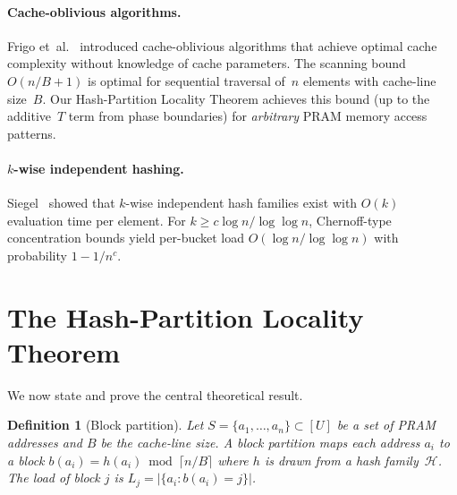 \documentclass[11pt]{article}
\newtheorem{definition}[theorem]{Definition}
\begin{document}
\paragraph{Cache-oblivious algorithms.}
Frigo et~al.~\cite{frigo1999cache} introduced cache-oblivious algorithms
that achieve optimal cache complexity without knowledge of cache parameters.
The scanning bound~$O(n/B + 1)$ is optimal for sequential traversal of~$n$
elements with cache-line size~$B$.  Our Hash-Partition Locality Theorem
achieves this bound (up to the additive~$T$ term from phase boundaries) for
\emph{arbitrary} PRAM memory access patterns.

\paragraph{$k$-wise independent hashing.}
Siegel~\cite{siegel2004hash} showed that $k$-wise independent hash families
exist with $O(k)$ evaluation time per element.  For $k \ge c\log n/\log\log n$,
Chernoff-type concentration bounds yield per-bucket load
$O(\!\log n/\log\log n)$ with probability $1 - 1/n^c$.


\section{The Hash-Partition Locality Theorem}
\label{sec:theorem}

We now state and prove the central theoretical result.

\begin{definition}[Block partition]
\label{def:block-partition}
Let $S = \{a_1, \ldots, a_n\} \subset [U]$ be a set of PRAM addresses and
$B$ be the cache-line size.  A \emph{block partition} maps each address
$a_i$ to a block $b(a_i) = h(a_i) \bmod \lceil n/B \rceil$ where $h$
is drawn from a hash family~$\mathcal{H}$.  The \emph{load} of block $j$ is
$L_j = |\{a_i : b(a_i) = j\}|$.
\end{definition}
\end{document}
